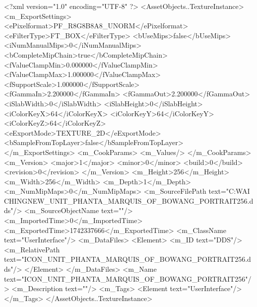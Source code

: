 <?xml version="1.0" encoding="UTF-8" ?>
<AssetObjects..TextureInstance>
	<m_ExportSettings>
		<ePixelformat>PF_R8G8B8A8_UNORM</ePixelformat>
		<eFilterType>FT_BOX</eFilterType>
		<bUseMips>false</bUseMips>
		<iNumManualMips>0</iNumManualMips>
		<bCompleteMipChain>true</bCompleteMipChain>
		<fValueClampMin>0.000000</fValueClampMin>
		<fValueClampMax>1.000000</fValueClampMax>
		<fSupportScale>1.000000</fSupportScale>
		<fGammaIn>2.200000</fGammaIn>
		<fGammaOut>2.200000</fGammaOut>
		<iSlabWidth>0</iSlabWidth>
		<iSlabHeight>0</iSlabHeight>
		<iColorKeyX>64</iColorKeyX>
		<iColorKeyY>64</iColorKeyY>
		<iColorKeyZ>64</iColorKeyZ>
		<eExportMode>TEXTURE_2D</eExportMode>
		<bSampleFromTopLayer>false</bSampleFromTopLayer>
	</m_ExportSettings>
	<m_CookParams>
		<m_Values/>
	</m_CookParams>
	<m_Version>
		<major>1</major>
		<minor>0</minor>
		<build>0</build>
		<revision>0</revision>
	</m_Version>
	<m_Height>256</m_Height>
	<m_Width>256</m_Width>
	<m_Depth>1</m_Depth>
	<m_NumMipMaps>0</m_NumMipMaps>
	<m_SourceFilePath text="C:\Users\YANG WAI CHING\Downloads\CIV\DDS NEW\ICON_UNIT_PHANTA_MARQUIS_OF_BOWANG_PORTRAIT256.dds"/>
	<m_SourceObjectName text=""/>
	<m_ImportedTime>0</m_ImportedTime>
	<m_ExportedTime>1742337666</m_ExportedTime>
	<m_ClassName text="UserInterface"/>
	<m_DataFiles>
		<Element>
			<m_ID text="DDS"/>
			<m_RelativePath text="ICON_UNIT_PHANTA_MARQUIS_OF_BOWANG_PORTRAIT256.dds"/>
		</Element>
	</m_DataFiles>
	<m_Name text="ICON_UNIT_PHANTA_MARQUIS_OF_BOWANG_PORTRAIT256"/>
	<m_Description text=""/>
	<m_Tags>
		<Element text="UserInterface"/>
	</m_Tags>
</AssetObjects..TextureInstance>

